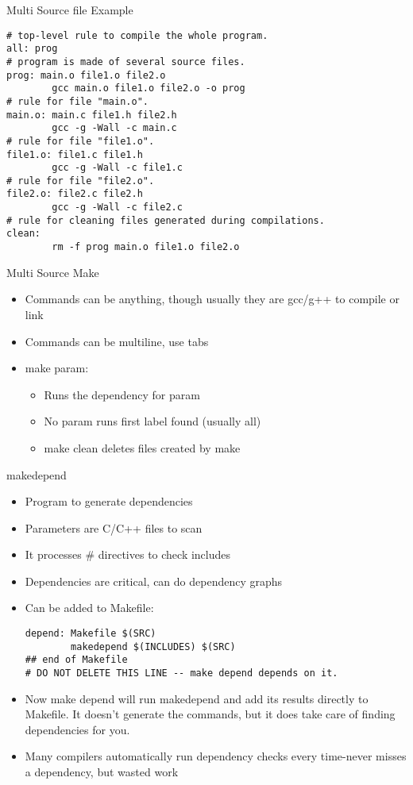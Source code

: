 \documentclass{beamer}
\begin{document}
\begin{frame}[fragile]{Multi Source file Example}
\begin{lstlisting}
# top-level rule to compile the whole program. 
all: prog 
# program is made of several source files. 
prog: main.o file1.o file2.o 
        gcc main.o file1.o file2.o -o prog 
# rule for file "main.o". 
main.o: main.c file1.h file2.h 
        gcc -g -Wall -c main.c 
# rule for file "file1.o". 
file1.o: file1.c file1.h 
        gcc -g -Wall -c file1.c 
# rule for file "file2.o". 
file2.o: file2.c file2.h 
        gcc -g -Wall -c file2.c 
# rule for cleaning files generated during compilations. 
clean: 
        rm -f prog main.o file1.o file2.o
\end{lstlisting}
\end{frame}

\begin{frame}{Multi Source Make}
\begin{itemize}
\item Commands can be anything, though usually they are gcc/g++ to compile or link
\item Commands can be multiline, use tabs
\item make param:
\begin{itemize}
\item Runs the dependency for param
\item No param runs first label found (usually all)
\item make clean deletes files created by make
\end{itemize}
\end{itemize}
\end{frame}

\begin{frame}[fragile]{makedepend}
\begin{itemize}
\item Program to generate dependencies
\item Parameters are C/C++ files to scan
\item It processes \# directives to check includes
\item Dependencies are critical, can do dependency graphs
\item Can be added to Makefile:\\
\begin{lstlisting}
depend: Makefile $(SRC) 
        makedepend $(INCLUDES) $(SRC) 
## end of Makefile 
# DO NOT DELETE THIS LINE -- make depend depends on it. 

\end{lstlisting}
\item Now make depend will run makedepend and add its results directly to Makefile.  It doesn't generate the commands, but it does take care of finding dependencies for you.  
\item Many compilers automatically run dependency checks every time-never misses a dependency, but wasted work
\end{itemize}
\end{frame}
\end{document}
